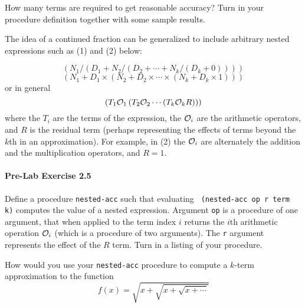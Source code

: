 How many terms are required to get
reasonable accuracy?  Turn in your procedure definition
together with some sample results.

The idea of a continued fraction can be generalized to include
arbitrary nested expressions such as (1) and (2) below:

\begin{equation} 
\left( {N_1/\left( {D_1+N_2/\left( {D_2+\cdots +N_k/\left( {D_k+0}
\right)} \right)} \right)} \right) 
\end{equation} 
\begin{equation} 
\left( {N_1+D_1\times \left( {N_2+D_2\times \cdots \times \left(
{N_k+D_k\times 1} \right)} \right)} \right)
\end{equation} 
or in general
\begin{displaymath} 
\left( T_1 {\cal O}_1 \left( T_2 {\cal O}_2 \cdots 
            \left( T_k {\cal O}_k R \right) \right) \right)
\end{displaymath} 
where the $T_i$ are the terms of the expression,
the ${\cal O}_i$ are the arithmetic operators, and $R$ is the
residual term (perhaps representing the effects of 
terms beyond the $k$th in an approximation). For example,
in (2) the ${\cal O}_i$ are alternately the addition and the
multiplication operators, and $R=1$.

\paragraph{Pre-Lab Exercise 2.5}
Define a procedure {\tt nested-acc} such that evaluating {\tt
(nested-acc op r term k)} computes the value of a nested expression.
Argument {\tt op} is a procedure of one argument, that when applied to
the term index $i$ returns the $i$th arithmetic operation ${\cal O}_i$
(which is a procedure of two arguments).  The {\tt r} argument
represents the effect of the $R$ term.  Turn in a listing of your
procedure.

How would you use your {\tt nested-acc} procedure to
compute a $k$-term approximation to the function
\begin{displaymath} 
f(x)=\sqrt {x+\sqrt {x+\sqrt {x+\cdots }}}
\end{displaymath} 

